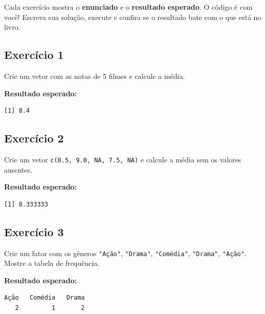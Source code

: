 \documentclass[
  letterpaper,
]{scrbook}
\begin{document}
\begin{tcolorbox}[enhanced jigsaw, arc=.35mm, bottomrule=.15mm, bottomtitle=1mm, breakable, colback=white, colbacktitle=quarto-callout-note-color!10!white, colframe=quarto-callout-note-color-frame, coltitle=black, left=2mm, leftrule=.75mm, opacityback=0, opacitybacktitle=0.6, rightrule=.15mm, title=\textcolor{quarto-callout-note-color}{\faInfo}\hspace{0.5em}{Como fazer os exercícios}, titlerule=0mm, toprule=.15mm, toptitle=1mm]

Cada exercício mostra o \textbf{enunciado} e o \textbf{resultado
esperado}. O código é com você! Escreva sua solução, execute e confira
se o resultado bate com o que está no livro.

\end{tcolorbox}

\subsection{Exercício 1}\label{exercuxedcio-1-7}

Crie um vetor com as notas de 5 filmes e calcule a média.

\textbf{Resultado esperado:}

\begin{verbatim}
[1] 8.4
\end{verbatim}

\subsection{Exercício 2}\label{exercuxedcio-2-7}

Crie um vetor \texttt{c(8.5,\ 9.0,\ NA,\ 7.5,\ NA)} e calcule a média
sem os valores ausentes.

\textbf{Resultado esperado:}

\begin{verbatim}
[1] 8.333333
\end{verbatim}

\subsection{Exercício 3}\label{exercuxedcio-3-6}

Crie um fator com os gêneros \texttt{"Ação"}, \texttt{"Drama"},
\texttt{"Comédia"}, \texttt{"Drama"}, \texttt{"Ação"}. Mostre a tabela
de frequência.

\textbf{Resultado esperado:}

\begin{verbatim}
Ação   Comédia   Drama 
   2         1       2 
\end{verbatim}
\end{document}
